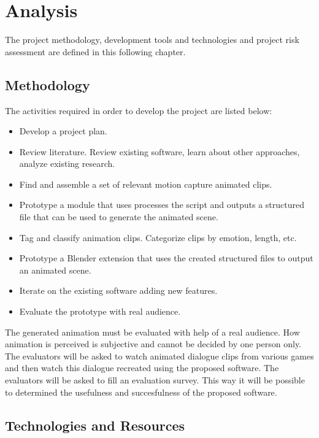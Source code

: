 \chapter{Analysis \label{chap:analysis}}

\noindent The project  methodology,  development  tools  and  technologies  and  project  risk assessment are defined in this following chapter.


\section{Methodology}

The activities required in order to develop the project are listed below:

\begin{itemize}
\item Develop a project plan.
\item Review literature. Review existing software, learn about other approaches, analyze existing research.
\item Find and assemble a set of relevant motion capture animated clips.
\item Prototype a module that uses processes the script and outputs a structured file that can be used to generate the animated scene.
\item Tag and classify animation clips. Categorize clips by emotion, length, etc.
\item Prototype a Blender extension that uses the created structured files to output an animated scene.
\item Iterate on the existing software adding new features.
\item Evaluate the prototype with real audience.
\end{itemize}

The generated animation must be evaluated with help of a real audience. How animation is perceived is subjective and cannot be decided by one person only. The evaluators will be asked to watch animated dialogue clips from various games and then watch this dialogue recreated using the proposed software. The evaluators will be asked to fill an evaluation survey. This way it will be possible to determined the usefulness and succesfulness of the proposed software.


\section{Technologies and Resources}

